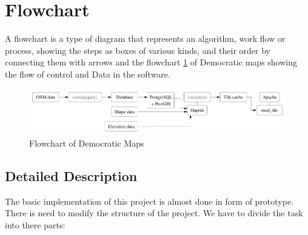 \section{Flowchart}
A flowchart is a type of diagram that represents an algorithm, work flow or process, showing the steps as boxes of various kinds, and their order by connecting them with arrows
and the flowchart \ref{fig:FD1} of Democratic maps showing the flow of control and Data in the software.

\begin{figure}
	\centering \includegraphics[width=\linewidth]{input/images/osmserv.png}
	\caption{Flowchart of Democratic Maps}
	\label{fig:FD1}
\end{figure}

\subsection{Detailed Description}

The basic implementation of this project is almost done in form of prototype. There is need to modify the structure of the project. We have to divide the task into there parts:

